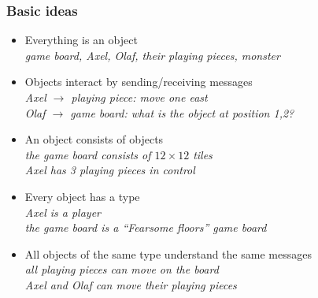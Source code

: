 \documentclass{slides}
\begin{document}
\begin{frame}
  \frametitle{Basic ideas}

  \begin{itemize}
  \item \alert{Everything is an object}\\
    \emph{game board, Axel, Olaf, their playing pieces, monster}
  \item \alert{Objects interact by sending/receiving messages}\\
    \emph{Axel $\rightarrow$ playing piece: move one east}\\
    \emph{Olaf $\rightarrow$ game board: what is the object at
      position 1,2?}\\
  \item \alert{An object consists of objects}\\
    \emph{the game board consists of $12\times 12$ tiles}\\
    \emph{Axel has 3 playing pieces in control}\\
  \item \alert{Every object has a type}\\
    \emph{Axel is a player}\\
    \emph{the game board is a ``Fearsome floors'' game board}
  \item \alert{All objects of the same type understand the same messages}\\
    \emph{all playing pieces can move on the board}\\
    \emph{Axel and Olaf can move their playing pieces}
  \end{itemize}
\end{frame}
\end{document}
